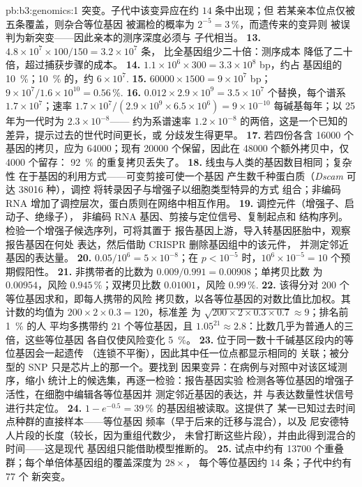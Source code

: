 \begin{solution}{pb:b3:genomics:1}
突变。子代中该变异应在约 $14$ 条中出现；但
若某亲本位点仅被五条覆盖，则杂合等位基因
被漏检的概率为 $2^{-5} = 3\,\%$，而遗传来的变异则
被误判为新突变——因此亲本的测序深度必须与
子代相当。
\textbf{13.} $4.8\times 10^{7}\times 100/150 = 3.2\times 10^{7}$ 条，
比全基因组少二十倍：测序成本
降低了二十倍，超过捕获步骤的成本。
\textbf{14.} $1.1\times 10^{6}\times 300 = 3.3\times 10^{8}$ bp，约占
基因组的 \qty{10}{\%}；\qty{10}{\%} 的，约 $6\times
10^{7}$.
\textbf{15.} $\num{60000}\times 1500 = 9\times 10^{7}$ bp；$9\times
10^{7}/1.6\times 10^{10} = 0.56\,\%$.
\textbf{16.} $0.012\times 2.9\times 10^{9} = 3.5\times 10^{7}$
个替换，每个谱系 $1.7\times 10^{7}$；速率 $1.7\times
10^{7}/(2.9\times 10^{9}\times 6.5\times 10^{6}) = 9\times 10^{-10}$
每碱基每年；以 25 年为一代时为 $2.3\times 10^{-8}$——
约为系谱速率 $1.2\times 10^{-8}$ 的两倍，这是一个已知的
差异，提示过去的世代时间更长，或
分歧发生得更早。
\textbf{17.} 若四份各含 \num{16000} 个基因的拷贝，应为 \num{64000}；现有 \num{20000}
个保留，因此在 \num{48000} 个额外拷贝中，仅 \num{4000} 个留存：
\qty{92}{\%} 的重复拷贝丢失了。
\textbf{18.} 线虫与人类的基因数目相同；复杂性
在于基因的利用方式——可变剪接可使一个基因
产生数千种蛋白质（\emph{Dscam} 可达 \num{38016} 种），调控
将转录因子与增强子以细胞类型特异的方式
组合；非编码 RNA 增加了调控层次，蛋白质则在网络中相互作用。
\textbf{19.} 调控元件（增强子、启动子、绝缘子），
非编码 RNA 基因、剪接与定位信号、复制起点和
结构序列。检验一个增强子候选序列，可将其置于
报告基因上游，导入转基因胚胎中，观察报告基因在何处
表达，然后借助 CRISPR 删除基因组中的该元件，
并测定邻近基因的表达量。
\textbf{20.} $0.05/10^{6} = 5\times 10^{-8}$；在 $p < 10^{-5}$ 时，$10^{6}
\times 10^{-5} = 10$ 个预期假阳性。
\textbf{21.} 非携带者的比数为 $0.009/0.991 = 0.00908$；单拷贝比数
为 $0.00954$，风险 $0.945\,\%$；双拷贝比数 $0.01001$，风险
$0.99\,\%$.
\textbf{22.} 该得分对 $200$ 个等位基因求和，即每人携带的风险
拷贝数，以各等位基因的对数比值比加权。其
计数的均值为 $200\times 2\times 0.3 = 120$，标准差
为 $\sqrt{200\times 2\times 0.3\times 0.7} \approx 9$；排名前 \qty{1}{\%} 的人
平均多携带约 $21$ 个等位基因，且 $1.05^{21} \approx
2.8$：比数几乎为普通人的三倍，这些等位基因
各自仅使风险变化 \qty{5}{\%}。
\textbf{23.} 位于同一数十千碱基区段内的等位基因会一起遗传
（连锁不平衡），因此其中任一位点都显示相同的
关联；被分型的 SNP 只是芯片上的那一个。要找到
因果变异：在病例与对照中对该区域测序，缩小
统计上的候选集，再逐一检验：报告基因实验
检测各等位基因的增强子活性，在细胞中编辑各等位基因并
测定邻近基因的表达，并
与表达数量性状信号进行共定位。
\textbf{24.} $1 - e^{-0.5} = 39\,\%$ 的基因组被读取。这提供了
某一已知过去时间点种群的直接样本——等位基因
频率（早于后来的迁移与混合），以及
尼安德特人片段的长度（较长，因为重组代数少，
未曾打断这些片段），并由此得到混合的时间——这是现代
基因组只能借助模型推断的。
\textbf{25.} 试点中约有 \num{13700} 个重叠群；每个单倍体基因组的覆盖深度为 $28\times$，
每个等位基因约 $14$ 条；子代中约有 $77$ 个
新突变。
\end{solution}
